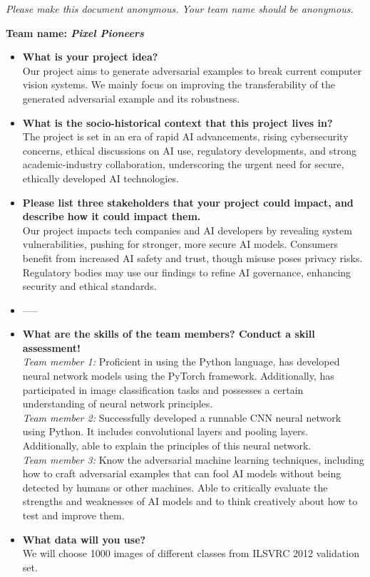 \emph{Please make this document anonymous. Your team name should be anonymous.}

\textbf{Team name: \emph{Pixel Pioneers}}

\begin{itemize}
  \item \textbf{What is your project idea?}\\
  Our project aims to generate adversarial examples to break current computer vision systems. We mainly focus on improving the transferability of the generated adversarial example and its robustness. 

  \item \textbf{What is the socio-historical context that this project lives in?}\\
  The project is set in an era of rapid AI advancements, rising cybersecurity concerns, ethical discussions on AI use, regulatory developments, and strong academic-industry collaboration, underscoring the urgent need for secure, ethically developed AI technologies.

  \item \textbf{Please list three stakeholders that your project could impact, and describe how it could impact them.}\\
  Our project impacts tech companies and AI developers by revealing system vulnerabilities, pushing for stronger, more secure AI models. Consumers benefit from increased AI safety and trust, though misuse poses privacy risks. Regulatory bodies may use our findings to refine AI governance, enhancing security and ethical standards.

  \item -----
  \item \textbf{What are the skills of the team members? Conduct a skill assessment!}\\
    \textit{Team member 1:} Proficient in using the Python language, has developed neural network models using the PyTorch framework. Additionally, has participated in image classification tasks and possesses a certain understanding of neural network principles.\\
    \textit{Team member 2:} Successfully developed a runnable CNN neural network using Python. It includes convolutional layers and pooling layers. Additionally, able to explain the principles of this neural network.\\
    \textit{Team member 3:} Know the adversarial machine learning techniques, including how to craft adversarial examples that can fool AI models without being detected by humans or other machines. Able to critically evaluate the strengths and weaknesses of AI models and to think creatively about how to test and improve them.
  \item \textbf{What data will you use?}\\
  We will choose 1000 images of different classes from ILSVRC 2012 validation set.
  

\end{itemize}
